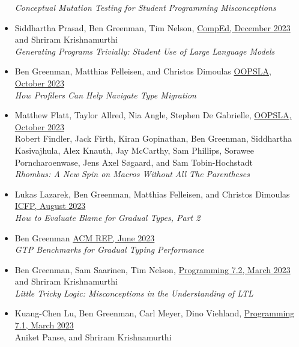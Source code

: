 \documentclass[11pt]{article}
\begin{document}
\begin{itemize}
  \emph{Conceptual Mutation Testing for Student Programming Misconceptions} \hfill {}
\item
  Siddhartha Prasad, Ben Greenman, Tim Nelson, \hfill \href{https://comped.acm.org/call-for-participation-2/}{CompEd, December 2023} \\
      and Shriram Krishnamurthi \\
    \emph{Generating Programs Trivially: Student Use of Large Language Models} \hfill {}
\item
  Ben Greenman, Matthias Felleisen, and Christos Dimoulas \hfill \href{https://2023.splashcon.org/track/splash-2023-oopsla}{OOPSLA, October 2023} \\
  \emph{How Profilers Can Help Navigate Type Migration} \hfill {}
\item
  Matthew Flatt, Taylor Allred, Nia Angle, Stephen De Gabrielle, \hfill \href{https://2023.splashcon.org/track/splash-2023-oopsla}{OOPSLA, October 2023} \\
  Robert Findler, Jack Firth, Kiran Gopinathan, Ben Greenman, Siddhartha Kasivajhula,
  Alex Knauth, Jay McCarthy, Sam Phillips, Sorawee Porncharoenwase, Jens Axel Søgaard, and Sam Tobin-Hochstadt \\
  \emph{Rhombus: A New Spin on Macros Without All The Parentheses} \hfill {}
\item
  Lukas Lazarek, Ben Greenman, Matthias Felleisen, and Christos Dimoulas \hfill \href{https://icfp23.sigplan.org/}{ICFP, August 2023} \\
  \emph{How to Evaluate Blame for Gradual Types, Part 2} \hfill {}
\item
  Ben Greenman \hfill \href{https://acm-rep.github.io/2023/}{ACM REP, June 2023} \\
    \emph{GTP Benchmarks for Gradual Typing Performance} \hfill {}
\item
  Ben Greenman, Sam Saarinen, Tim Nelson, \hfill \href{https://2023.programming-conference.org/}{Programming 7.2, March 2023} \\
   and Shriram Krishnamurthi  \\ 
    \emph{Little Tricky Logic: Misconceptions in the Understanding of LT\/L} \hfill {}
\item
  Kuang-Chen Lu, Ben Greenman, Carl Meyer, Dino Viehland, \hfill \href{https://2023.programming-conference.org/}{Programming 7.1, March 2023} \\
  Aniket Panse, and Shriram Krishnamurthi \\

\end{itemize}
\end{document}
